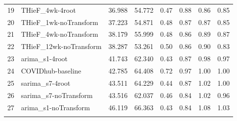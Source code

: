 \documentclass[thesis]{umassthesis}  %
\begin{document}
\begin{longtable}{llrrrrrr}
  19 & THieF\_4wk-4root & 36.988 & 54.772 & 0.47 & 0.88 & 0.86 & 0.85 \\ 
  20 & THieF\_1wk-noTransform & 37.223 & 54.871 & 0.48 & 0.87 & 0.87 & 0.85 \\ 
  21 & THieF\_4wk-noTransform & 38.179 & 55.999 & 0.48 & 0.86 & 0.89 & 0.87 \\ 
  22 & THieF\_12wk-noTransform & 38.287 & 53.261 & 0.50 & 0.86 & 0.90 & 0.83 \\ 
  23 & arima\_s1-4root & 41.743 & 62.340 & 0.43 & 0.87 & 0.98 & 0.97 \\ 
  24 & COVIDhub-baseline & 42.785 & 64.408 & 0.72 & 0.97 & 1.00 & 1.00 \\ 
  25 & sarima\_s7-4root & 43.511 & 64.229 & 0.44 & 0.87 & 1.02 & 1.00 \\ 
  26 & sarima\_s7-noTransform & 43.516 & 62.037 & 0.46 & 0.84 & 1.02 & 0.96 \\ 
  27 & arima\_s1-noTransform & 46.119 & 66.363 & 0.43 & 0.84 & 1.08 & 1.03 \\ 
   \hline
\hline
\label{tab:table_last17_states}
\end{longtable}
\endgroup

\newpage
\end{document}
